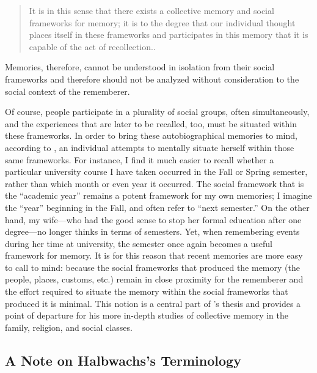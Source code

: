 \begin{quote}
It is in this sense that there exists a collective memory and social
frameworks for memory; it is to the degree that our individual thought
places itself in these frameworks and participates in this memory that
it is capable of the act of recollection.\autocite[38]{halbwachs1992}.
\end{quote}

Memories, therefore, cannot be understood in isolation from their social
frameworks and therefore should not be analyzed without consideration to
the social context of the rememberer.

Of course, people participate in a plurality of social groups, often
simultaneously, and the experiences that are later to be recalled, too,
must be situated within these frameworks. In order to bring these
autobiographical memories to mind, according to
\halbwachs, an individual attempts to mentally situate
herself within those same frameworks. For instance, I find it much
easier to recall whether a particular university course I have taken
occurred in the Fall or Spring semester, rather than which month or even
year it occurred. The social framework that is the ``academic year''
remains a potent framework for my own memories; I imagine the ``year''
beginning in the Fall, and often refer to ``next semester.'' On the
other hand, my wife---who had the good sense to stop her formal
education after one degree---no longer thinks in terms of semesters.
Yet, when remembering events during her time at university, the semester
once again becomes a useful framework for memory. It is for this reason
that recent memories are more easy to call to mind: because the social
frameworks that produced the memory (the people, places, customs, etc.)
remain in close proximity for the rememberer and the effort required to
situate the memory within the social frameworks that produced it is
minimal.\autocite[52]{halbwachs1992} This notion is a central part of
\halbwachs's thesis and provides a point of departure
for his more in-depth studies of collective memory in the family,
religion, and social classes.

\hypertarget{a-note-on-halbwachss-terminology}{%
\subsection{A Note on Halbwachs's
Terminology}\label{a-note-on-halbwachss-terminology}}

